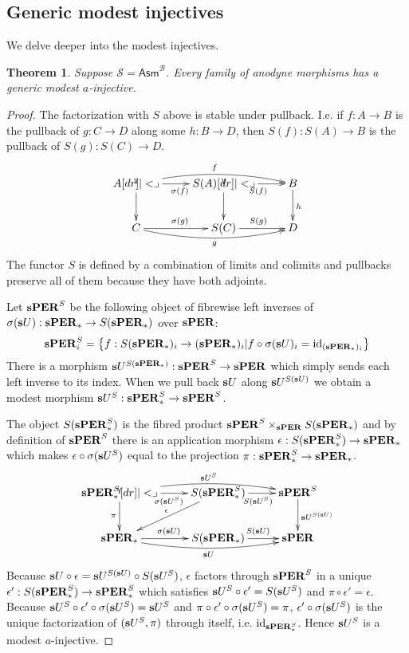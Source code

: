 \documentclass{amsart}
\theoremstyle{plain}
\newtheorem{theorem}{Theorem}
\theoremstyle{definition}
\newcommand\hide[1]{}
\newcommand\cat\mathcal
\newcommand\set[1]{\left\{#1\right\}}
\newcommand\id{\mathrm{id}}
\newcommand\Asm{\mathsf{Asm}}
\begin{document}
\subsection{Generic modest injectives} We delve deeper into the modest injectives.

\begin{theorem} Suppose $\cat S =\Asm^{\cat B}$. Every family of anodyne morphisms has a generic modest $a$-injective. \label{geninjmod} \end{theorem}

\begin{proof} The factorization with $S$ above is stable under pullback. I.e. if $f: A\to B$ is the pullback of $g:C\to D$ along some $h:B\to D$, then $S(f):S(A)\to B$ is the pullback of $S(g):S(C) \to D$.
\[\xymatrix{
A\ar[r]_{\sigma(f)} \ar@/^2ex/[rr]^{f}\ar[d]\pb & S(A) \ar[r]_{S(f)}\ar[d]\pb & B\ar[d]^h\\
C\ar[r]^{\sigma(g)} \ar@/_2ex/[rr]_{g} & S(C) \ar[r]^{S(g)} & D
}\]
The functor $S$ is defined by a combination of limits and colimits and pullbacks preserve all of them because they have both adjoints.

Let $\mathbf{s}\mathbf{PER}^S$ be the following object of fibrewise left inverses of $\sigma(\mathbf{s} U):\mathbf{s}\mathbf{PER}_* \to S(\mathbf{s}\mathbf{PER}_*)$ over $\mathbf{s}\mathbf{PER}$:
\[ \rat\pers^S_i = \set{ f:S(\rat\pers_*)_i\to (\rat\pers_*)_i| f\circ\sigma(\rat U)_i = \id_{(\rat\pers_*)_i}} \] 
There is a morphism $\mathbf{s} U^{S(\mathbf{s}\mathbf{PER}_*)}:\mathbf{s}\mathbf{PER}^S\to \mathbf{s}\mathbf{PER}$ which simply sends each left inverse to its index.
When we pull back $\mathbf{s} U$ along $\mathbf{s} U^{S(\mathbf{s} U)}$ we obtain a modest morphism $\mathbf{s} U^S:\mathbf{s}\mathbf{PER}_*^S \to \mathbf{s}\mathbf{PER}^S$.

The object $S(\mathbf{s}\mathbf{PER}_*^S)$ is the fibred product $\mathbf{s}\mathbf{PER}^S\times_{\mathbf{s}\mathbf{PER}}S(\mathbf{s}\mathbf{PER}_*)$ and by definition of $\mathbf{s}\mathbf{PER}^S$ there is an application morphism $\epsilon:S(\mathbf{s}\mathbf{PER}_*^S)\to \mathbf{s}\mathbf{PER}_*$ which makes $\epsilon\circ \sigma(\mathbf{s} U^S)$ equal to the projection $\pi:\mathbf{s}\mathbf{PER}_*^S\to\mathbf{s}\mathbf{PER}_*$.
\[\xymatrix{
\rat\pers_*^S\ar[r]_{\sigma(\rat U^S)} \ar@/^2ex/[rr]^{\rat U^S}\ar[d]_\pi\pb & S(\rat\pers_*^S) \ar[r]_{S(\rat U^S)}\hide{\ar[d]^{)}_{(}\pb}\ar[dl]_\epsilon & \rat\pers^S\ar[d]^{\rat U^{S(\rat U)}}\\
\rat\pers_*\ar[r]^{\sigma(\rat U)} \ar@/_2ex/[rr]_{\rat U} & S(\rat\pers_*) \ar[r]^{S(\rat U)} & \rat\pers
}\]
\hide{Warning: in this diagram $\sigma(\rat U)\circ\epsilon$ is not equal to the projection $S(\rat\pers_*^S) \to S(\rat\pers_*)$, hence the parentheses in the diagram above. }Because $\mathbf{s} U\circ \epsilon = \mathbf{s} U^{S(\mathbf{s} U)}\circ S(\mathbf{s} U^S)$, $\epsilon$ factors through $\mathbf{s}\mathbf{PER}^S$ in a unique $\epsilon':S(\mathbf{s}\mathbf{PER}_*^S)\to\mathbf{s}\mathbf{PER}_*^S$ which satisfies $\mathbf{s} U^S\circ\epsilon' = S(\mathbf{s} U^S)$ and $\pi\circ \epsilon'= \epsilon$. Because $\mathbf{s} U^S\circ\epsilon'\circ \sigma(\mathbf{s} U^S) = \mathbf{s} U^S$ and $\pi\circ \epsilon'\circ \sigma(\mathbf{s} U^S) = \pi$, $\epsilon'\circ \sigma(\mathbf{s} U^S)$ is the unique factorization of $(\mathbf{s} U^S,\pi)$ through itself, i.e. $\id_{\rat\pers_*^S}$. Hence $\mathbf{s} U^S$ is a modest $a$-injective.


\end{proof}
\end{document}
